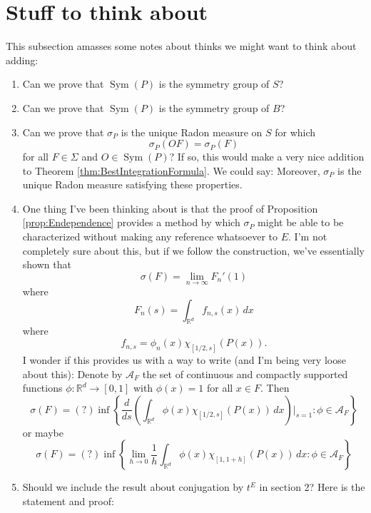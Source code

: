 \documentclass[11pt]{article}
\newcommand\Sym{\operatorname{Sym}}
\begin{document}
\section{Stuff to think about}
This subsection amasses some notes about thinks we might want to think about adding:
\begin{enumerate}
    \item Can we prove that $\Sym(P)$ is the symmetry group of $S$? 
    
    \item Can we prove that $\Sym(P)$ is the symmetry group of $B$?
    
    
    \item Can we prove that $\sigma_P$ is the unique Radon measure on $S$ for which 
    \begin{equation*}
        \sigma_P(OF)=\sigma_P(F)
    \end{equation*}
    for all $F\in\Sigma$ and $O\in\Sym(P)$? If so, this would make a very nice addition to Theorem \ref{thm:BestIntegrationFormula}. We could say: Moreover, $\sigma_P$ is the unique Radon measure satisfying these properties. 
    \item One thing I've been thinking about is that the proof of Proposition \ref{prop:Endependence} provides a method by which $\sigma_P$ might be able to be characterized without making any reference whatsoever to $E$. I'm not completely sure about this, but if we follow the construction, we've essentially shown that
\begin{equation*}
\sigma(F)=\lim_{n\to\infty}F_n'(1)
\end{equation*}
where
\begin{equation*}
F_n(s)=\int_{\mathbb{R}^d}f_{n,s}(x)\,dx
\end{equation*}
where
\begin{equation*}
f_{n,s}=\phi_n(x)\chi_{[1/2,s]}(P(x)).
\end{equation*}
I wonder if this provides us with a way to write (and I'm being very loose about this): Denote by $\mathcal{A}_F$ the set of continuous and compactly supported functions $\phi:\mathbb{R}^d\to [0,1]$ with $\phi(x)=1$ for all $x\in F$. Then
\begin{equation*}
\sigma(F)=(?)\inf\left\{\frac{d}{ds}\left(\int_{\mathbb{R}^d}\phi(x)\chi_{[1/2,s]}(P(x))\,dx\right)\bigg\vert_{s=1}:\phi\in \mathcal{A}_F\right\}
\end{equation*}
or maybe
\begin{equation*}
\sigma(F)=(?)\inf\left\{\lim_{h\to 0}\frac{1}{h}\int_{\mathbb{R}^d}\phi(x)\chi_{[1,1+h]}(P(x))\,dx:\phi\in \mathcal{A}_F\right\}
\end{equation*}
\item Should we include the result about conjugation by $t^E$ in section 2? Here is the statement and proof:


\end{enumerate}
\end{document}
